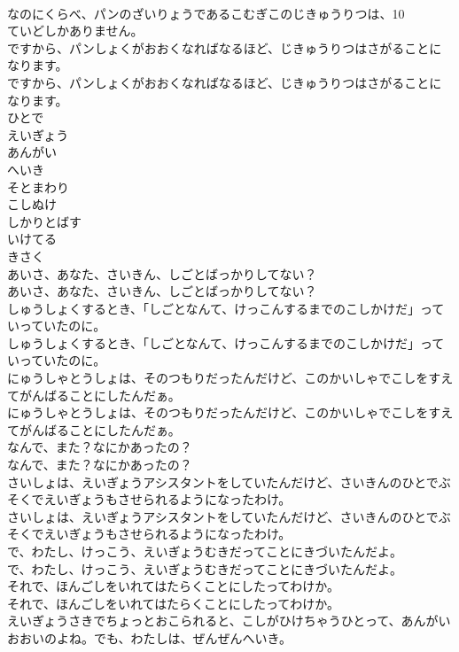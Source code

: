 \documentclass[8pt]{extreport}
\begin{document}
\begin{CJK}{UTF8}{min}
\\	なのにくらべ、パンのざいりょうであるこむぎこのじきゅうりつは、10
\\	ていどしかありません。
\\	ですから、パンしょくがおおくなればなるほど、じきゅうりつはさがることになります。
\\	ですから、パンしょくがおおくなればなるほど、じきゅうりつはさがることになります。
\\	ひとで
\\	えいぎょう
\\	あんがい
\\	へいき
\\	そとまわり
\\	こしぬけ
\\	しかりとばす
\\	いけてる
\\	きさく
\\	あいさ、あなた、さいきん、しごとばっかりしてない？
\\	あいさ、あなた、さいきん、しごとばっかりしてない？
\\	しゅうしょくするとき、「しごとなんて、けっこんするまでのこしかけだ」っていっていたのに。
\\	しゅうしょくするとき、「しごとなんて、けっこんするまでのこしかけだ」っていっていたのに。
\\	にゅうしゃとうしょは、そのつもりだったんだけど、このかいしゃでこしをすえてがんばることにしたんだぁ。
\\	にゅうしゃとうしょは、そのつもりだったんだけど、このかいしゃでこしをすえてがんばることにしたんだぁ。
\\	なんで、また？なにかあったの？
\\	なんで、また？なにかあったの？
\\	さいしょは、えいぎょうアシスタントをしていたんだけど、さいきんのひとでぶそくでえいぎょうもさせられるようになったわけ。
\\	さいしょは、えいぎょうアシスタントをしていたんだけど、さいきんのひとでぶそくでえいぎょうもさせられるようになったわけ。
\\	で、わたし、けっこう、えいぎょうむきだってことにきづいたんだよ。
\\	で、わたし、けっこう、えいぎょうむきだってことにきづいたんだよ。
\\	それで、ほんごしをいれてはたらくことにしたってわけか。
\\	それで、ほんごしをいれてはたらくことにしたってわけか。
\\	えいぎょうさきでちょっとおこられると、こしがひけちゃうひとって、あんがいおおいのよね。でも、わたしは、ぜんぜんへいき。

\end{CJK}
\end{document}
